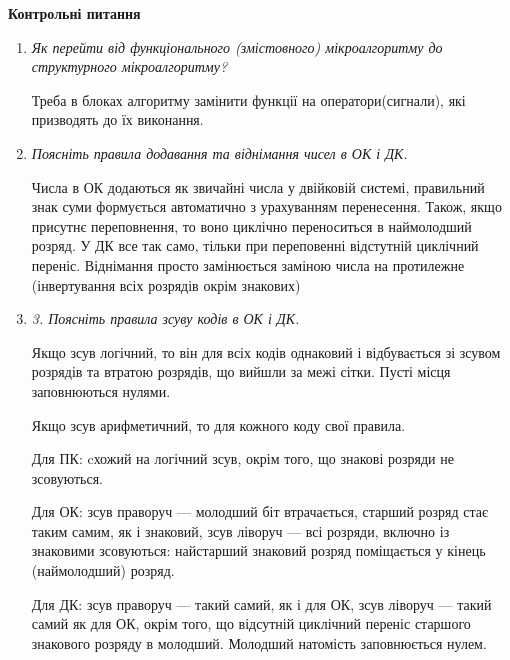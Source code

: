\documentclass[12pt,a4paper]{article}
\begin{document}
    \newpage

    \begin{center} \textbf{\large Контрольні питання} \end{center}

    \begin{enumerate}
        \item \textit{Як перейти від функціонального (змістовного) мікроалгоритму до структурного мікроалгоритму?}
        
        Треба в блоках алгоритму замінити функції на оператори(сигнали), які призводять до їх виконання.
        \vspace{1em}

        \item \textit{Поясніть правила додавання та віднімання чисел в ОК і ДК.}
        
        Числа в ОК додаються як звичайні числа у двійковій системі, правильний знак суми формується автоматично з урахуванням перенесення. Також, якщо присутнє переповнення, то воно циклічно переноситься в наймолодший розряд.
        У ДК все так само, тільки при переповенні відстутній циклічний переніс. Віднімання просто замінюється заміною числа на протилежне (інвертування всіх розрядів окрім знакових)
        \vspace{1em}

        \item \textit{3. Поясніть правила зсуву кодів в ОК і ДК.}
        
        Якщо зсув логічний, то він для всіх кодів однаковий і відбувається зі зсувом розрядів та втратою розрядів, що вийшли за межі сітки. Пусті місця заповнюються нулями.

        Якщо зсув арифметичний, то для кожного коду свої правила.
        
        Для ПК: cхожий на логічний зсув, окрім того, що знакові розряди не зсовуються.

        Для ОК: зсув праворуч --- молодший біт втрачається, старший розряд стає таким самим, як і знаковий, зсув ліворуч --- всі розряди, включно із знаковими зсовуються: найстарший знаковий розряд поміщається у кінець (наймолодший) розряд.

        Для ДК: зсув праворуч --- такий самий, як і для ОК, зсув ліворуч --- такий самий як для ОК, окрім того, що відсутній циклічний переніс старшого знакового розряду в молодший. Молодший натомість заповнюється нулем.

        \vspace{1em}


\end{enumerate}
\end{document}
